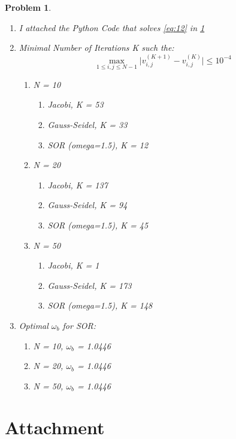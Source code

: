 \documentclass[a4paper,12pt]{article}
\newtheorem{prob}{Problem}[]
\begin{document}
\begin{prob}
\begin{enumerate}[label=(\alph*)]
		\item I attached the Python Code that solves \eqref{eq:12} in \ref{code}
		
		\item Minimal Number of Iterations K such the:
		\begin{equation*}
		\max_{1\leq i,j\leq N-1} \Bigg|v_{i,j}^{(K+1)} - v_{i,j}^{(K)}\Bigg| \leq 10^{-4}
		\end{equation*}
		\begin{enumerate}
			\item N = 10
			\begin{enumerate}
				\item Jacobi, K = 53
				\item Gauss-Seidel, K = 33
				\item SOR (omega=1.5), K = 12
			\end{enumerate}
			\item N = 20
			\begin{enumerate}
				\item Jacobi, K = 137
				\item Gauss-Seidel, K = 94
				\item SOR (omega=1.5), K = 45
			\end{enumerate}
			\item N = 50
			\begin{enumerate}
				\item Jacobi, K = 1
				\item Gauss-Seidel, K = 173
				\item SOR (omega=1.5), K = 148
			\end{enumerate}
		\end{enumerate}
		
		\item Optimal $\omega_b$ for SOR:
		\begin{enumerate}
			\item N = 10, $\omega_b$ = 1.0446
			\item N = 20, $\omega_b$ = 1.0446
			\item N = 50, $\omega_b$ = 1.0446
		\end{enumerate}
	\end{enumerate}
\end{prob}
\newpage
\section{Attachment}\label{code}

\end{document}
